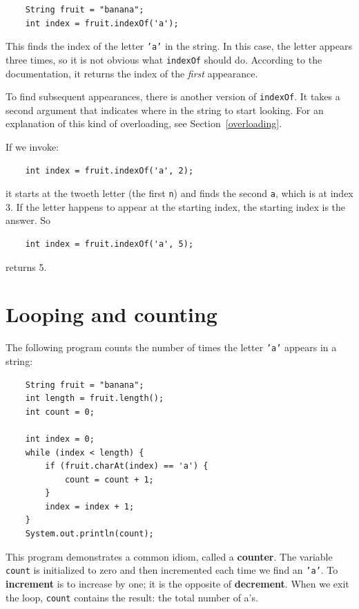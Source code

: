 \documentclass[12pt]{book}
\theoremstyle{exercise}
\begin{document}
\begin{lstlisting}
    String fruit = "banana";
    int index = fruit.indexOf('a');
\end{lstlisting}
%
This finds the index of the letter {\tt 'a'} in the string.
In this case, the letter appears three times, so it is not
obvious what {\tt indexOf} should do.  According to the
documentation, it returns the index of the {\em first} appearance.

To find subsequent appearances, there is another
version of {\tt indexOf}.  It takes a
second argument that indicates where in the string to start
looking.  For an explanation of this kind
of overloading, see Section~\ref{overloading}.

If we invoke:

\begin{lstlisting}
    int index = fruit.indexOf('a', 2);
\end{lstlisting}
%
it starts at the twoeth letter (the first {\tt n}) and finds
the second {\tt a}, which is at index 3.  If the letter happens
to appear at the starting index, the starting index is the
answer.  So

\begin{lstlisting}
    int index = fruit.indexOf('a', 5);
\end{lstlisting}
%
returns 5.


\section{Looping and counting}
\label{loopcount}

The following program counts the
number of times the letter {\tt 'a'} appears in a string:

\begin{lstlisting}
    String fruit = "banana";
    int length = fruit.length();
    int count = 0;

    int index = 0;
    while (index < length) {
        if (fruit.charAt(index) == 'a') {
            count = count + 1;
        }
        index = index + 1;
    }
    System.out.println(count);
\end{lstlisting}
%
This program demonstrates a common idiom, called a {\bf counter}.  The
variable {\tt count} is initialized to zero and then incremented each
time we find an {\tt 'a'}. To {\bf increment} is to increase by one;
it is the opposite of {\bf decrement}.
When we exit the loop, {\tt count}
contains the result: the total number of a's.
\end{document}
